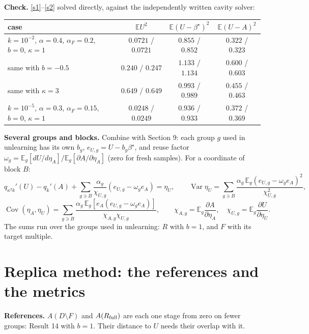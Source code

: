 \documentclass[10pt]{article}
\newcommand{\bs}{\beta^\star}\newcommand{\E}{\mathbb E}\newcommand{\asinh}{\operatorname{arcsinh}}\newcommand{\sk}{\sqrt k}
\newcommand{\Rf}{R_{\rm full}}\newcommand{\Ff}{F_{\rm full}}\newcommand{\dSh}{d_{\rm Sh}}
\begin{document}
\textbf{Check.} \eqref{s1}--\eqref{s2} solved directly, against the independently written cavity solver:
\begin{center}\small\begin{tabular}{@{}lccc@{}}\toprule
case & $\E U^2$ & $\E(U-\bs)^2$ & $\E(U-A)^2$\\\midrule
$k=10^{-2}$, $\alpha=0.4$, $\alpha_F=0.2$, $b=0$, $\kappa=1$ & $0.0721$ / $0.0721$ & $0.855$ / $0.852$ & $0.322$ / $0.323$\\
same with $b=-0.5$ & $0.240$ / $0.247$ & $1.133$ / $1.134$ & $0.600$ / $0.603$\\
same with $\kappa=3$ & $0.649$ / $0.649$ & $0.993$ / $0.989$ & $0.455$ / $0.463$\\
$k=10^{-5}$, $\alpha=0.3$, $\alpha_F=0.15$, $b=0$, $\kappa=1$ & $0.0248$ / $0.0249$ & $0.936$ / $0.933$ & $0.372$ / $0.369$\\\bottomrule
\end{tabular}\end{center}

\textbf{Several groups and blocks.} Combine with Section 9: each group $g$ used in unlearning has its own $b_g$, $e_{U,g}=U-b_g\bs$, and reuse factor $\omega_g=\E_g[dU/d\eta_A]\big/\E_g[\partial A/\partial\eta_A]$ (zero for fresh samples). For a coordinate of block $B$:
\begin{equation}\label{s2g}
q_{\kappa^2k}'(U)-q_k'(A)+\sum_{g\ni B}\frac{\alpha_g}{\chi_{U,g}}(e_{U,g}-\omega_ge_A)=\eta_U,\qquad
\operatorname{Var}\eta_U=\sum_{g\ni B}\frac{\alpha_g\,\E_g(e_{U,g}-\omega_ge_A)^2}{\chi_{U,g}^2},
\end{equation}
\[
\operatorname{Cov}(\eta_A,\eta_U)=\sum_{g\ni B}\frac{\alpha_g\,\E_g[e_A(e_{U,g}-\omega_ge_A)]}{\chi_{A,g}\chi_{U,g}},\qquad\chi_{A,g}=\E_g\frac{\partial A}{\partial\eta_A},\quad\chi_{U,g}=\E_g\frac{\partial U}{\partial\eta_U}.
\]
The sums run over the groups used in unlearning: $R$ with $b=1$, and $F$ with its target multiple.

\section{Replica method: the references and the metrics}
\textbf{References.} $A(D\setminus F)$ and $A(\Rf)$ are each one stage from zero on fewer groups: Result 14 with $b=1$. Their distance to $U$ needs their overlap with it.
\end{document}
